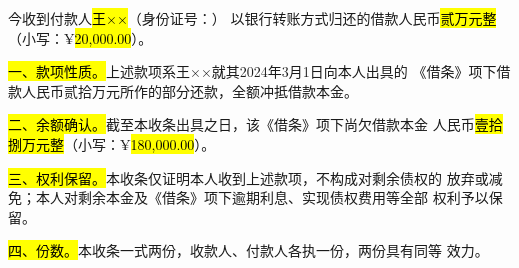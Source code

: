 \documentclass[zihao=-4]{ctexart}
\begin{document}

今收到付款人\hl{王××}（身份证号：）
以银行转账方式归还的借款人民币\hl{贰万元整}（小写：¥\hl{20,000.00}）。

\hl{一、款项性质。}上述款项系王××就其2024年3月1日向本人出具的
《借条》项下借款人民币贰拾万元所作的部分还款，全额冲抵借款本金。

\hl{二、余额确认。}截至本收条出具之日，该《借条》项下尚欠借款本金
人民币\hl{壹拾捌万元整}（小写：¥\hl{180,000.00}）。

\hl{三、权利保留。}本收条仅证明本人收到上述款项，不构成对剩余债权的
放弃或减免；本人对剩余本金及《借条》项下逾期利息、实现债权费用等全部
权利予以保留。

\hl{四、份数。}本收条一式两份，收款人、付款人各执一份，两份具有同等
效力。

\vspace{0.8\baselineskip}
\end{document}
